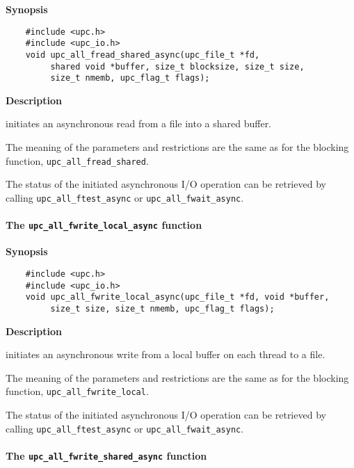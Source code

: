 {\bf Synopsis}

\npf\vspace{-2.5em}
\begin{verbatim}
    #include <upc.h>
    #include <upc_io.h>
    void upc_all_fread_shared_async(upc_file_t *fd,
         shared void *buffer, size_t blocksize, size_t size,
         size_t nmemb, upc_flag_t flags);
\end{verbatim}

{\bf Description}

 initiates an asynchronous read from a file
into a shared buffer.

\np The meaning of the parameters and restrictions are the same as for the
blocking function, {\tt upc\_all\_fread\_shared}.

\np The status of the initiated asynchronous I/O operation can be retrieved by calling
{\tt upc\_all\_ftest\_async} or {\tt upc\_all\_fwait\_async}.

\paragraph{The {\tt upc\_all\_fwrite\_local\_async} function}

{\bf Synopsis}

\npf\vspace{-2.5em}
\begin{verbatim}
    #include <upc.h>
    #include <upc_io.h>
    void upc_all_fwrite_local_async(upc_file_t *fd, void *buffer,
         size_t size, size_t nmemb, upc_flag_t flags);
\end{verbatim}

{\bf Description}

 initiates an asynchronous write from a
local buffer on each thread to a file.

\np The meaning of the parameters and restrictions are the same as for the
blocking function, {\tt upc\_all\_fwrite\_local}.

\np The status of the initiated asynchronous I/O operation can be retrieved by calling
{\tt upc\_all\_ftest\_async} or {\tt upc\_all\_fwait\_async}.

\paragraph{The {\tt upc\_all\_fwrite\_shared\_async} function}

